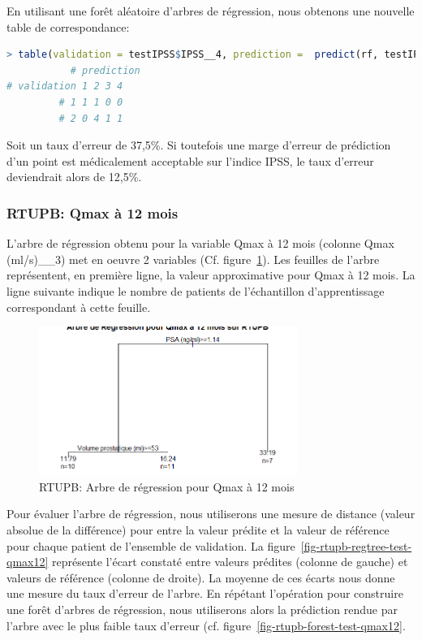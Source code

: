 En utilisant une forêt aléatoire d'arbres de régression, nous obtenons une nouvelle table de correspondance:
\begin{lstlisting}[language=R]
> table(validation = testIPSS$IPSS__4, prediction =  predict(rf, testIPSS))
           # prediction
# validation 1 2 3 4
         # 1 1 1 0 0
         # 2 0 4 1 1
\end{lstlisting}
Soit un taux d'erreur de 37,5\%. Si toutefois une marge d'erreur de prédiction d'un point est médicalement acceptable sur l'indice IPSS, le taux d'erreur deviendrait alors de 12,5\%.

\subsubsection{RTUPB: Qmax à 12 mois}

L'arbre de régression obtenu pour la variable Qmax à 12 mois (colonne Qmax (ml/s)\_\_3) met en oeuvre 2 variables (Cf. figure~\ref{fig-rtupb-regtree-qmax12}). Les feuilles de l'arbre représentent, en première ligne, la valeur approximative pour Qmax à 12 mois. La ligne suivante indique le nombre de patients de l'échantillon d'apprentissage correspondant à cette feuille. 

\begin{figure}[H]
\centering
\includegraphics[width=0.75\textwidth]{../Fig/RTUPB/rtupb-regtree-qmax12.png}
\caption{RTUPB: Arbre de régression pour Qmax à 12 mois}
\label{fig-rtupb-regtree-qmax12}
\end{figure}

Pour évaluer l'arbre de régression, nous utiliserons une mesure de distance (valeur absolue de la différence) pour entre la valeur prédite et la valeur de référence pour chaque patient de l'ensemble de validation. 
La figure~\ref{fig-rtupb-regtree-test-qmax12} représente l'écart constaté entre valeurs prédites (colonne de gauche) et valeurs de référence (colonne de droite). La moyenne de ces écarts nous donne une mesure du taux d'erreur de l'arbre. En répétant l'opération pour construire une forêt d'arbres de régression, nous utiliserons alors la prédiction rendue par l'arbre avec le plus faible taux d'erreur (cf. figure~\ref{fig-rtupb-forest-test-qmax12}.

